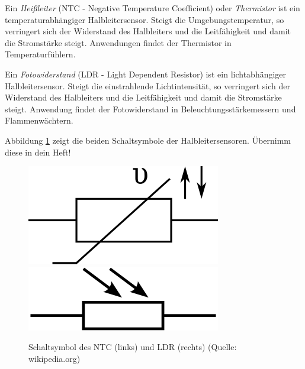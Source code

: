 \begin{sich}
Ein \emph{Heißleiter} (NTC - Negative Temperature Coefficient) oder \emph{Thermistor} ist ein temperaturabhängiger Halbleitersensor.
Steigt die Umgebungstemperatur, so verringert sich der Widerstand des Halbleiters und die Leitfähigkeit und damit die Stromstärke steigt.
Anwendungen findet der Thermistor in Temperaturfühlern.

Ein \emph{Fotowiderstand} (LDR - Light Dependent Resistor) ist ein lichtabhängiger Halbleitersensor.
Steigt die einstrahlende Lichtintensität, so verringert sich der Widerstand des Halbleiters und die Leitfähigkeit und damit die Stromstärke steigt.
Anwendung findet der Fotowiderstand in Beleuchtungsstärkemessern und Flammenwächtern.
\end{sich}

Abbildung \ref{Abb:ntcldr} zeigt die beiden Schaltsymbole der Halbleitersensoren. Übernimm diese in dein Heft!

\begin{figure}[htp]
\begin{center}
\includegraphics[scale=.4]{pics/ntc}
~~~~
\includegraphics[scale=.5]{pics/ldr}
\caption{Schaltsymbol des NTC (links) und LDR (rechts) (Quelle: wikipedia.org)}
\label{Abb:ntcldr}
\end{center}
\end{figure}


